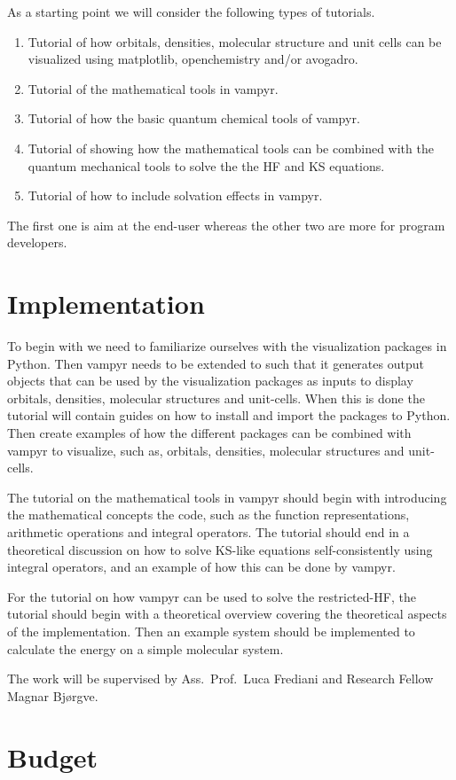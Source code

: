 \documentclass[12pt]{article}
\begin{document}
As a starting point we will consider the following types of tutorials.

\begin{enumerate}
    \item Tutorial of how orbitals, densities, molecular structure and unit cells
    can be visualized using matplotlib, openchemistry and/or avogadro.
    \item Tutorial of the mathematical tools in \ac{vampyr}.
    \item Tutorial of how the basic quantum chemical tools of \ac{vampyr}.
    \item Tutorial of showing how the mathematical tools can be combined
    with the quantum mechanical tools to solve the
    the \ac{HF} and \ac{KS} equations.
    \item Tutorial of how to include solvation effects in \ac{vampyr}.
\end{enumerate}

The first one is aim at the end-user whereas the other two are more
for program developers.

\section{Implementation}

To begin with we need to familiarize ourselves with the visualization packages in
Python.
Then \ac{vampyr} needs to be extended to such that it generates output objects
that can be used by the visualization packages as inputs to display orbitals,
densities, molecular structures and unit-cells. When this is done the tutorial
will contain guides on how to install and import the packages to Python.
Then create examples of how the different
packages can be combined with \ac{vampyr} to visualize, such as, orbitals,
densities, molecular structures and unit-cells.

The tutorial on the mathematical tools in \ac{vampyr} should begin
with introducing the mathematical concepts the code, such as
the function representations, arithmetic operations and integral
operators. The tutorial should end in a theoretical discussion
on how to solve \ac{KS}-like equations self-consistently using
integral operators, and an example of how this can be done
by \ac{vampyr}.

For the tutorial on how \ac{vampyr} can be used to solve the restricted-\ac{HF},
the tutorial should begin with a theoretical overview covering the theoretical
aspects of the implementation. Then an example system should be implemented
to calculate the energy on a simple molecular system.

The work will be supervised by Ass.~Prof.~Luca Frediani and Research Fellow
Magnar Bj\o rgve.

\section{Budget}





\end{document}
